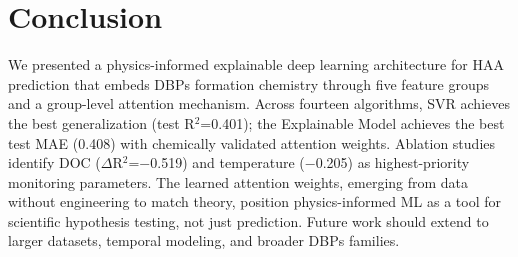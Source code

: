 \documentclass[runningheads]{llncs}
\begin{document}
\section{Conclusion}

We presented a physics-informed explainable deep learning architecture for HAA prediction that embeds DBPs formation chemistry through five feature groups and a group-level attention mechanism. Across fourteen algorithms, SVR achieves the best generalization (test R$^2$=0.401); the Explainable Model achieves the best test MAE (0.408) with chemically validated attention weights. Ablation studies identify DOC ($\Delta$R$^2$=$-$0.519) and temperature ($-$0.205) as highest-priority monitoring parameters. The learned attention weights, emerging from data without engineering to match theory, position physics-informed ML as a tool for scientific hypothesis testing, not just prediction. Future work should extend to larger datasets, temporal modeling, and broader DBPs families.




\end{document}
